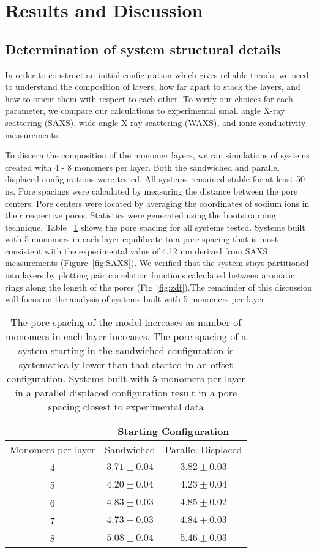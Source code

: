 \section*{Results and Discussion}
\subsection*{Determination of system structural details}
In order to construct an initial configuration which gives reliable 
trends, we need to understand the composition of layers, how far apart
to stack the layers, and how to orient them with respect to each other.
To verify our choices for each parameter, we compare our calculations
to experimental small angle X-ray scattering (SAXS), wide angle X-ray
scattering (WAXS), and ionic conductivity measurements.

To discern the composition of the monomer layers, we ran simulations of 
systems created with 4 - 8 monomers per layer. Both the sandwiched and 
parallel displaced configurations were tested. All systems remained
stable for at least 50 ns. Pore spacings were calculated by measuring
the distance between the pore centers. Pore centers were located by
averaging the coordinates of sodium ions in their respective pores. 
Statistics were generated using the bootstrapping technique. Table
~\ref{table:p2p} shows the pore spacing for all systems tested.
Systems built with 5 monomers in each layer equilibrate to a pore
spacing that is most consistent with the experimental value of 4.12 nm
derived from SAXS measurements (Figure~\ref{fig:SAXS}). We verified 
that the system stays partitioned into layers by plotting pair 
correlation functions calculated between aromatic rings along the
length of the pores (Fig~\ref{fig:zdf}).The remainder of this 
discussion will focus on the analysis of systems built with 5
monomers per layer. 

\begin{table}[H]
\centering
\begin{tabular}{ccc}
\toprule
                   & \multicolumn{2}{c}{Starting Configuration} \\
\hline
Monomers per layer & Sandwiched & Parallel Displaced \\
\midrule
4 & $3.71 \pm 0.04$ & $3.82 \pm 0.03$ \\
5 & $4.20 \pm 0.04$ & $4.23 \pm 0.04$ \\
6 & $4.83 \pm 0.03$ & $4.85 \pm 0.02$ \\
7 & $4.73 \pm 0.03$ & $4.84 \pm 0.03$ \\
8 & $5.08 \pm 0.04$ & $5.46 \pm 0.03$ \\
\bottomrule
\end{tabular}
\caption{The pore spacing of the model increases as number of monomers
in each layer increases. The pore spacing of a system starting in the 
sandwiched configuration is systematically lower than that started in an 
offset configuration. Systems built with 5 monomers per layer in a parallel
displaced configuration result in a pore spacing closest to experimental
data}\label{table:p2p} 
\end{table}

